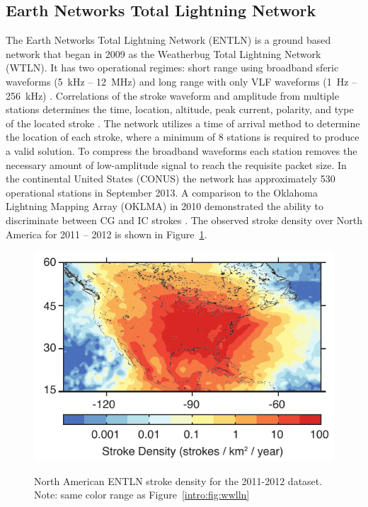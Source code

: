 \subsection{Earth Networks Total Lightning Network}

The Earth Networks Total Lightning Network (ENTLN) is a ground based network that began in 2009 as the Weatherbug Total Lightning Network (WTLN).
It has two operational regimes: short range using broadband sferic waveforms (5~kHz -- 12~MHz) and long range with only VLF waveforms (1~Hz -- 256~kHz) \citep{Heckman2010}.
Correlations of the stroke waveform and amplitude from multiple stations determines the time, location, altitude, peak current, polarity, and type of the located stroke \citep{Liu2011a}.
The network utilizes a time of arrival method to determine the location of each stroke, where a minimum of 8 stations is required to produce a valid solution.
To compress the broadband waveforms each station removes the necessary amount of low-amplitude signal to reach the requisite packet size.
In the continental United States (CONUS) the network has approximately 530 operational stations in September 2013.
A comparison to the Oklahoma Lightning Mapping Array (OKLMA) in 2010 demonstrated the ability to discriminate between CG and IC strokes \citep{Beasley2010}.
The observed stroke density over North America for 2011 -- 2012 is shown in Figure~\ref{intro:fig:entln}.

\begin{figure}[ht!]
	\centering
	\includegraphics[scale=1]{Introduction/Figures/entln_density.pdf}\\
	\caption{North American ENTLN stroke density for the 2011-2012 dataset.
	              Note: same color range as Figure~\ref{intro:fig:wwlln}}
	\label{intro:fig:entln}
\end{figure}

